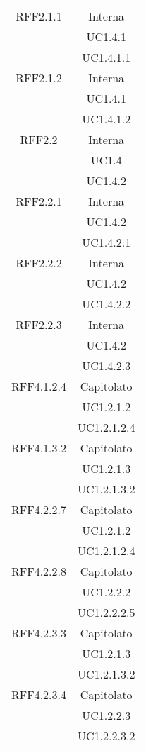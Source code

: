 \begin{longtable}{|c|c|}
\midrule
RFF2.1.1
& Interna\\
& UC1.4.1\\
& UC1.4.1.1\\

\midrule
RFF2.1.2
& Interna\\
& UC1.4.1\\
& UC1.4.1.2\\

\midrule
RFF2.2
& Interna\\
& UC1.4\\
& UC1.4.2\\

\midrule
RFF2.2.1
& Interna\\
& UC1.4.2\\
& UC1.4.2.1\\

\midrule
RFF2.2.2
& Interna\\
& UC1.4.2\\
& UC1.4.2.2\\

\midrule
RFF2.2.3
& Interna\\
& UC1.4.2\\
& UC1.4.2.3\\

\midrule
RFF4.1.2.4
& Capitolato\\
& UC1.2.1.2\\
& UC1.2.1.2.4\\

\midrule
RFF4.1.3.2
& Capitolato\\
& UC1.2.1.3\\
& UC1.2.1.3.2\\

\midrule
RFF4.2.2.7
& Capitolato\\
& UC1.2.1.2\\
& UC1.2.1.2.4\\

\midrule
RFF4.2.2.8
& Capitolato\\
& UC1.2.2.2\\
& UC1.2.2.2.5\\

\midrule
RFF4.2.3.3
& Capitolato\\
& UC1.2.1.3\\
& UC1.2.1.3.2\\

\midrule
RFF4.2.3.4
& Capitolato\\
& UC1.2.2.3\\
& UC1.2.2.3.2\\


\end{longtable}
